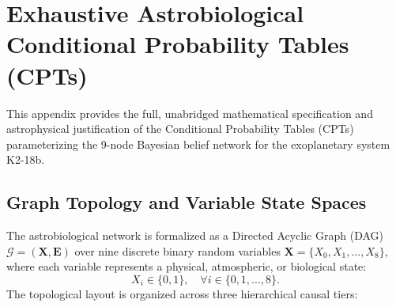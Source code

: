 \chapter{Exhaustive Astrobiological Conditional Probability Tables (CPTs)}\label{app:complete_cpts}

This appendix provides the full, unabridged mathematical specification and astrophysical justification of the Conditional Probability Tables (CPTs) parameterizing the 9-node Bayesian belief network for the exoplanetary system K2-18b.

\section{Graph Topology and Variable State Spaces}\label{sec:app_graph_topology}

The astrobiological network is formalized as a Directed Acyclic Graph (DAG) $\mathcal{G} = (\mathbf{X}, \mathbf{E})$ over nine discrete binary random variables $\mathbf{X} = \{X_0, X_1, \dots, X_8\}$, where each variable represents a physical, atmospheric, or biological state:
\begin{equation}
X_i \in \{0, 1\}, \quad \forall i \in \{0, 1, \dots, 8\}.
\end{equation}
The topological layout is organized across three hierarchical causal tiers:

